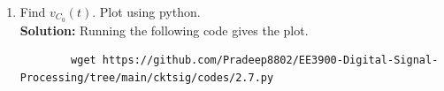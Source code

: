 \documentclass[journal,12pt,twocolumn]{IEEEtran}
\newcommand{\solution}{\noindent \textbf{Solution: }}
\providecommand{\brak}[1]{\ensuremath{\left(#1\right)}}
\providecommand{\system}[1]{\overset{\mathcal{#1}}{ \longleftrightarrow}}
\numberwithin{equation}{section}
\renewcommand\thesection{\arabic{section}}
\begin{document}
\begin{enumerate}[label=\arabic*.,ref=\thesection.\theenumi]
\begin{figure}[!ht]
			\caption{}
			\label{fig:lap-ckt}
\end{figure}
		where 
		\begin{align}
			u(t) \system{L} V_1(s)
			\\
			2u(t) \system{L} V_2(s)
		\end{align}
		Find the voltage across the capacitor $V_{C_0}(s)$.\\
		\solution
		\begin{align}
		R_{eff}=\frac{1}{1+\frac{1}{2}}
		=\frac{2}{3} \Omega\\
		V_{eff}=\frac{1}{1+\frac{1}{2}}
		=\frac{2}{3}V
		\end{align}
\begin{align}
V_{C_0}(s)&=V_{S}(s)\frac{C_{0}}{C_{0}+R_{eff}}\\
&=\brak{\frac{4}{3s}}\brak{\frac{\frac{1}{s}}{\frac{1}{s}+\frac{2}{3}}}\\
\label{eq:laptr}
&=\frac{3+4s}{3s\brak{s+\frac{3}{2}}}
\end{align}
	\item Find $v_{C_0}(t)$.  Plot using python.\\
	\solution Running the following code gives the plot.
	\begin{lstlisting}
		wget https://github.com/Pradeep8802/EE3900-Digital-Signal-Processing/tree/main/cktsig/codes/2.7.py
	\end{lstlisting}
	

\end{enumerate}
\end{document}
